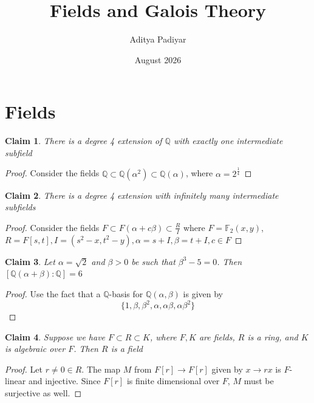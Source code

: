 \documentclass{article}
\title{Fields and Galois Theory}
\author{Aditya Padiyar}
\date{August 2026}
\newtheorem{claim}{Claim}
\begin{document}
\maketitle

\section{Fields}

\begin{claim}
  There is a degree 4 extension of $\mathbb{Q}$ with exactly one intermediate subfield
\end{claim}

\begin{proof}
  Consider the fields $\mathbb{Q} \subset \mathbb{Q}(\alpha^2) \subset \mathbb{Q}(\alpha)$, where $\alpha = 2^\frac{1}{4}$ 
\end{proof}

\begin{claim}
  There is a degree 4 extension with infinitely many intermediate subfields
\end{claim}

\begin{proof}
  Consider the fields $F \subset F(\alpha +c \beta) \subset \frac{R}{I}$ where $F = \mathbb{F}_2(x,y)$, $R=F[s,t], I = (s^2-x,t^2-y), \alpha = s + I, \beta = t + I, c \in F$ 
\end{proof}

\begin{claim}
  Let $\alpha = \sqrt{2}$ and $\beta > 0$ be such that $\beta^3 - 5 = 0$. Then $[\mathbb{Q}(\alpha + \beta): \mathbb{Q}]=6$
\end{claim}

\begin{proof}
  Use the fact that a $\mathbb{Q}$-basis for $\mathbb{Q}(\alpha,\beta)$ is given by \[\{1,\beta,\beta^2,\alpha,\alpha\beta,\alpha\beta^2\}\]
\end{proof}

\begin{claim}
  Suppose we have $F \subset R \subset K$, where $F,K$ are fields, $R$ is a ring, and $K$ is algebraic over $F$. Then $R$ is a field
\end{claim}

\begin{proof}
  Let $r \neq 0 \in R$. The map $M$ from $F[r] \to F[r]$ given by $x \to rx$ is $F$-linear and injective. Since $F[r]$ is finite dimensional over $F$, $M$ must be surjective as well.
\end{proof}
\end{document}
